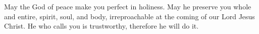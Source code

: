 
\lettrine{M}{}ay the God of peace make you perfect in holiness. May he preserve you whole and entire, spirit, soul, and body, irreproachable at the coming of our Lord Jesus Christ. He who calls you is trustworthy, therefore he will do it.